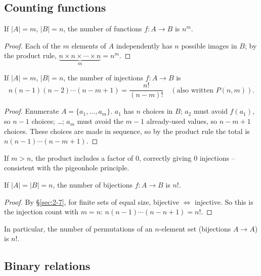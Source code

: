 \subsection{Counting functions}
\label{sec:2-12}

\begin{theorem}
If $|A|=m$, $|B|=n$, the number of functions $f: A \to B$ is $n^m$.
\end{theorem}
\begin{proof}
Each of the $m$ elements of $A$ independently has $n$ possible images in $B$; by the product rule, $\underbrace{n \times n \times \cdots \times n}_{m} = n^m$.
\end{proof}

\begin{theorem}
If $|A|=m$, $|B|=n$, the number of injections $f: A \to B$ is
\[
n(n-1)(n-2)\cdots(n-m+1) = \frac{n!}{(n-m)!} \quad (\text{also written } P(n,m)).
\]
\end{theorem}
\begin{proof}
Enumerate $A = \{a_1,\dots,a_m\}$. $a_1$ has $n$ choices in $B$; $a_2$ must avoid $f(a_1)$, so $n-1$ choices; \dots; $a_m$ must avoid the $m-1$ already-used values, so $n-m+1$ choices. These choices are made in sequence, so by the product rule the total is $n(n-1)\cdots(n-m+1)$.
\end{proof}

\begin{note}
If $m > n$, the product includes a factor of $0$, correctly giving $0$ injections -- consistent with the pigeonhole principle.
\end{note}

\begin{theorem}
If $|A|=|B|=n$, the number of bijections $f: A \to B$ is $n!$.
\end{theorem}
\begin{proof}
By \S\ref{sec:2-7}, for finite sets of equal size, bijective $\iff$ injective. So this is the injection count with $m=n$: $n(n-1)\cdots(n-n+1) = n!$.
\end{proof}

\begin{note}
In particular, the number of permutations of an $n$-element set (bijections $A \to A$) is $n!$.
\end{note}

\subsection{Binary relations}
\label{sec:2-13}


